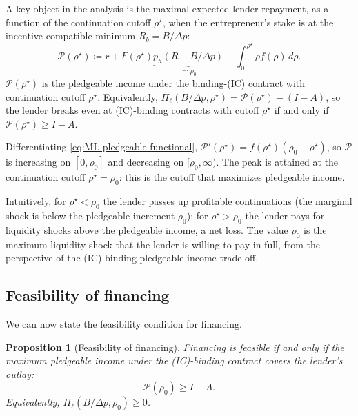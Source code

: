 \documentclass[11pt,a4paper,oneside]{book}
\def\geq{\geqslant}
\theoremstyle{plain}
\newtheorem{proposition}[theorem]{Proposition}
\theoremstyle{definition}
\theoremstyle{remark}
\numberwithin{equation}{chapter}
\begin{document}
A key object in the analysis is the maximal expected lender repayment, as a function of the continuation cutoff $\rho^\star$, when the entrepreneur's stake is at the incentive-compatible minimum $R_b = B/\Delta p$:
\begin{equation}\label{eq:ML-pledgeable-functional}
  \mathcal{P}(\rho^\star) \coloneqq r + F(\rho^\star) \underbrace{p_h (R - B/\Delta p)}_{\eqqcolon \rho_0} - \int_0^{\rho^\star} \rho f(\rho) \, d\rho.
\end{equation}
$\mathcal{P}(\rho^\star)$ is the pledgeable income under the binding-(IC) contract with continuation cutoff $\rho^\star$.
Equivalently, $\Pi_\ell(B/\Delta p, \rho^\star) = \mathcal{P}(\rho^\star) - (I - A)$, so the lender breaks even at (IC)-binding contracts with cutoff $\rho^\star$ if and only if $\mathcal{P}(\rho^\star) \geq I - A$.

Differentiating \eqref{eq:ML-pledgeable-functional}, $\mathcal{P}'(\rho^\star) = f(\rho^\star)(\rho_0 - \rho^\star)$, so $\mathcal{P}$ is increasing on $[0, \rho_0]$ and decreasing on $[\rho_0, \infty)$.
The peak is attained at the continuation cutoff $\rho^\star = \rho_0$: this is the cutoff that maximizes pledgeable income.

Intuitively, for $\rho^\star < \rho_0$ the lender passes up profitable continuations (the marginal shock is below the pledgeable increment $\rho_0$); for $\rho^\star > \rho_0$ the lender pays for liquidity shocks above the pledgeable income, a net loss.
The value $\rho_0$ is the maximum liquidity shock that the lender is willing to pay in full, from the perspective of the (IC)-binding pledgeable-income trade-off.

\subsection{Feasibility of financing}

We can now state the feasibility condition for financing.

\begin{proposition}[Feasibility of financing]\label{prop:ML-feasibility}
Financing is feasible if and only if the maximum pledgeable income under the (IC)-binding contract covers the lender's outlay:
\begin{equation}\label{eq:ML-feasibility}
  \mathcal{P}(\rho_0) \geq I - A.
\end{equation}
Equivalently, $\Pi_\ell(B/\Delta p, \rho_0) \geq 0$.
\end{proposition}
\end{document}
